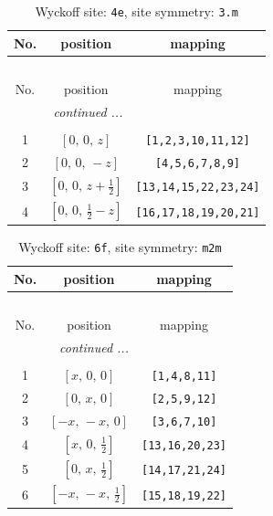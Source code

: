 \documentclass[fleqn,8pt]{jsarticle}
\begin{document}
\renewcommand{\arraystretch}{1.2}
\begin{longtable}{ccc}
\caption{Wyckoff site: {\tt 4e}, site symmetry: {\tt 3.m}}
 \\
 \hline \hline
No. & position & mapping \\ \hline \endfirsthead

\multicolumn{2}{l}{\tablename\ \thetable{}} \\
 \hline \hline
No. & position & mapping \\ \hline \endhead

 \hline \hline
\multicolumn{2}{r}{\footnotesize\it continued ...} \\ \endfoot

 \hline \hline
\multicolumn{2}{r}{} \\ \endlastfoot

1 & $\left[ 0,\, 0,\, z \right]$ & {\tt [1,2,3,10,11,12]} \\ \hline
2 & $\left[ 0,\, 0,\, - z \right]$ & {\tt [4,5,6,7,8,9]} \\ \hline
3 & $\left[ 0,\, 0,\, z + \frac{1}{2} \right]$ & {\tt [13,14,15,22,23,24]} \\ \hline
4 & $\left[ 0,\, 0,\, \frac{1}{2} - z \right]$ & {\tt [16,17,18,19,20,21]} \\
\end{longtable}
\renewcommand{\arraystretch}{1.2}
\begin{longtable}{ccc}
\caption{Wyckoff site: {\tt 6f}, site symmetry: {\tt m2m}}
 \\
 \hline \hline
No. & position & mapping \\ \hline \endfirsthead

\multicolumn{2}{l}{\tablename\ \thetable{}} \\
 \hline \hline
No. & position & mapping \\ \hline \endhead

 \hline \hline
\multicolumn{2}{r}{\footnotesize\it continued ...} \\ \endfoot

 \hline \hline
\multicolumn{2}{r}{} \\ \endlastfoot

1 & $\left[ x,\, 0,\, 0 \right]$ & {\tt [1,4,8,11]} \\ \hline
2 & $\left[ 0,\, x,\, 0 \right]$ & {\tt [2,5,9,12]} \\ \hline
3 & $\left[ - x,\, - x,\, 0 \right]$ & {\tt [3,6,7,10]} \\ \hline
4 & $\left[ x,\, 0,\, \frac{1}{2} \right]$ & {\tt [13,16,20,23]} \\ \hline
5 & $\left[ 0,\, x,\, \frac{1}{2} \right]$ & {\tt [14,17,21,24]} \\ \hline
6 & $\left[ - x,\, - x,\, \frac{1}{2} \right]$ & {\tt [15,18,19,22]} \\
\end{longtable}
\end{document}
